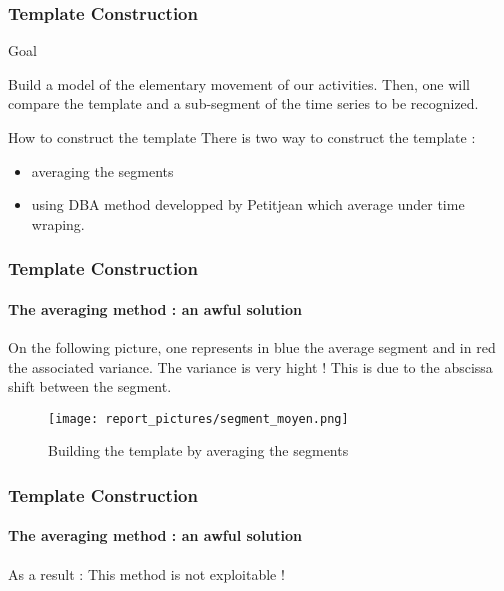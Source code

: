 \documentclass[11pt, sans, handout]{beamer}
\begin{document}
\begin{frame}
	\frametitle{Template Construction}
	
	\begin{alertblock}{Goal}

		Build a model of the elementary movement of our activities. Then, one will compare the template and a sub-segment of the time series to be recognized.

	\end{alertblock}
	
	\begin{block}{How to construct the template}
	There is two way to construct the template : 
	\begin{itemize}
		\item averaging the segments
		\item using DBA method developped by Petitjean\cite{petitjean} which average under time wraping.
	\end{itemize}	  
	\end{block}
	
\end{frame}

\begin{frame}
	\frametitle{Template Construction}
	\framesubtitle{The averaging method : an awful solution}
	
	On the following picture, one represents in blue the average segment and in red the associated variance. The variance is very hight ! This is due to the abscissa shift between the segment.
	
	\begin{figure}
	\texttt{[image: report\_pictures/segment\_moyen.png]}
	\caption{Building the template by averaging the segments}
	\end{figure}
	
\end{frame}

\begin{frame}
	\frametitle{Template Construction}
	\framesubtitle{The averaging method : an awful solution}
	
	\begin{alertblock}{As a result :}
	This method is not exploitable !
	\end{alertblock}

\end{frame}
\end{document}
